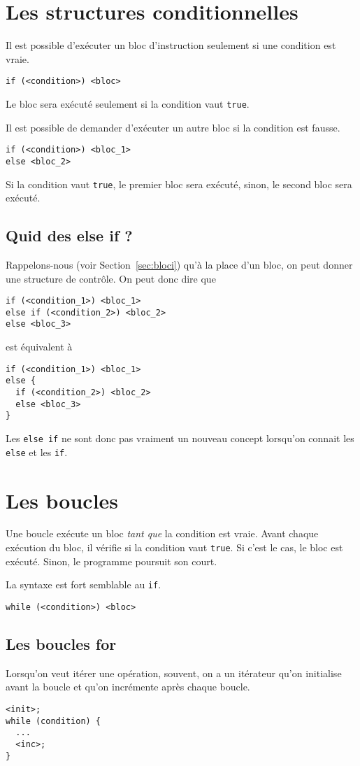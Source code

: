 \section{Les structures conditionnelles}
Il est possible d'exécuter un bloc d'instruction seulement si une condition
est vraie.
\begin{lstlisting}
if (<condition>) <bloc>
\end{lstlisting}
Le bloc sera exécuté seulement si la condition vaut \verb|true|.

Il est possible de demander d'exécuter un autre bloc si la condition est fausse.
\begin{lstlisting}
if (<condition>) <bloc_1>
else <bloc_2>
\end{lstlisting}
Si la condition vaut \verb|true|, le premier bloc sera exécuté, sinon, le
second bloc sera exécuté.

\subsection{Quid des else if ?}
Rappelons-nous (voir Section~\ref{sec:bloci}) qu'à la place d'un bloc,
on peut donner une structure de contrôle.
On peut donc dire que
\begin{lstlisting}
if (<condition_1>) <bloc_1>
else if (<condition_2>) <bloc_2>
else <bloc_3>
\end{lstlisting}
est équivalent à
\begin{lstlisting}
if (<condition_1>) <bloc_1>
else {
  if (<condition_2>) <bloc_2>
  else <bloc_3>
}
\end{lstlisting}

Les \verb|else if| ne sont donc pas vraiment un nouveau concept lorsqu'on
connait les \verb|else| et les \verb|if|.

\section{Les boucles}
Une boucle exécute un bloc \emph{tant que} la condition est vraie.
Avant chaque exécution du bloc, il vérifie si la condition vaut \verb|true|.
Si c'est le cas, le bloc est exécuté.
Sinon, le programme poursuit son court.

La syntaxe est fort semblable au \verb|if|.
\begin{lstlisting}
while (<condition>) <bloc>
\end{lstlisting}

\subsection{Les boucles for}
Lorsqu'on veut itérer une opération, souvent, on a un itérateur qu'on
initialise avant la boucle et qu'on incrémente après chaque boucle.
\begin{lstlisting}
<init>;
while (condition) {
  ...
  <inc>;
}
\end{lstlisting}

